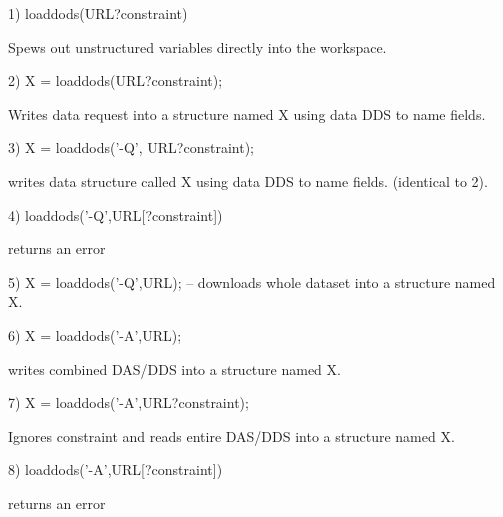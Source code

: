 1) loaddods(URL?constraint)

  Spews out unstructured variables directly into the workspace.

2) X = loaddods(URL?constraint);

  Writes data request into a structure named X using data DDS to
  name fields.

3) X = loaddods('-Q', URL?constraint);

  writes data structure called X using data DDS to name fields.
  (identical to 2).

4) loaddods('-Q',URL[?constraint])

   returns an error

5) X = loaddods('-Q',URL); -- downloads whole dataset into a 
   structure named X.

6) X = loaddods('-A',URL);

  writes combined DAS/DDS into a structure named X.

7) X = loaddods('-A',URL?constraint);

  Ignores constraint and reads entire DAS/DDS into a structure named X.

8) loaddods('-A',URL[?constraint])

  returns an error